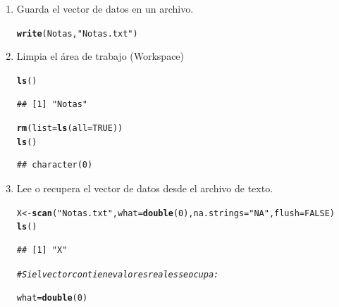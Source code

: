 \documentclass[12pt,letterpaper]{article}\usepackage[]{graphicx}\usepackage[]{color}
\makeatletter
\newcommand{\hlnum}[1]{\textcolor[rgb]{0.686,0.059,0.569}{#1}}%
\newcommand{\hlstr}[1]{\textcolor[rgb]{0.192,0.494,0.8}{#1}}%
\newcommand{\hlcom}[1]{\textcolor[rgb]{0.678,0.584,0.686}{\textit{#1}}}%
\newcommand{\hlstd}[1]{\textcolor[rgb]{0.345,0.345,0.345}{#1}}%
\newcommand{\hlkwb}[1]{\textcolor[rgb]{0.69,0.353,0.396}{#1}}%
\newcommand{\hlkwc}[1]{\textcolor[rgb]{0.333,0.667,0.333}{#1}}%
\newcommand{\hlkwd}[1]{\textcolor[rgb]{0.737,0.353,0.396}{\textbf{#1}}}%
\newenvironment{kframe}{%
 \def\at@end@of@kframe{}%
 \ifinner\ifhmode%
  \def\at@end@of@kframe{\end{minipage}}%
  \begin{minipage}{\columnwidth}%
 \fi\fi%
 \def\FrameCommand##1{\hskip\@totalleftmargin \hskip-\fboxsep
 \colorbox{shadecolor}{##1}\hskip-\fboxsep
     \hskip-\linewidth \hskip-\@totalleftmargin \hskip\columnwidth}%
 \MakeFramed {\advance\hsize-\width
   \@totalleftmargin\z@ \linewidth\hsize
   \@setminipage}}%
 {\par\unskip\endMakeFramed%
 \at@end@of@kframe}
\newenvironment{knitrout}{}{} %
\makeatother
\begin{document}
\begin{enumerate}
\item Guarda el vector de datos en un archivo.
\begin{knitrout}
\color{fgcolor}\begin{kframe}
\begin{alltt}
\hlkwd{write}\hlstd{(Notas,} \hlstr{"Notas.txt"}\hlstd{)}
\end{alltt}
\end{kframe}
\end{knitrout}

\item  Limpia el \'area de trabajo (Workspace)
\begin{knitrout}
\color{fgcolor}\begin{kframe}
\begin{alltt}
\hlkwd{ls}\hlstd{()}
\end{alltt}
\begin{verbatim}
## [1] "Notas"
\end{verbatim}
\begin{alltt}
\hlkwd{rm}\hlstd{(}\hlkwc{list}\hlstd{=}\hlkwd{ls}\hlstd{(}\hlkwc{all}\hlstd{=}\hlnum{TRUE}\hlstd{))}
\hlkwd{ls}\hlstd{()}
\end{alltt}
\begin{verbatim}
## character(0)
\end{verbatim}
\end{kframe}
\end{knitrout}

\item  Lee o recupera el vector de datos desde el archivo de texto. 
\begin{knitrout}
\color{fgcolor}\begin{kframe}
\begin{alltt}
\hlstd{X} \hlkwb{<-} \hlkwd{scan}\hlstd{(}\hlstr{"Notas.txt"}\hlstd{,} \hlkwc{what} \hlstd{=} \hlkwd{double}\hlstd{(}\hlnum{0}\hlstd{),} \hlkwc{na.strings} \hlstd{=} \hlstr{"NA"}\hlstd{,} \hlkwc{flush}\hlstd{=}\hlnum{FALSE}\hlstd{)}
\hlkwd{ls}\hlstd{()}
\end{alltt}
\begin{verbatim}
## [1] "X"
\end{verbatim}
\begin{alltt}
\hlcom{# Si el vector contiene valores reales se ocupa:}

\hlstd{what} \hlkwb{=} \hlkwd{double}\hlstd{(}\hlnum{0}\hlstd{)}
\end{alltt}
\end{kframe}
\end{knitrout}


\end{enumerate}
\end{document}
